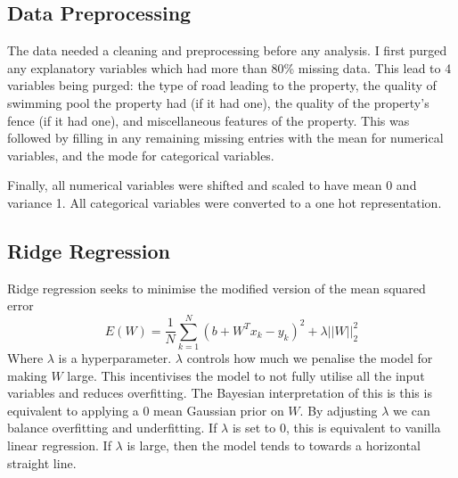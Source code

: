 \documentclass[10pt, twoside]{article}
\begin{document}
\subsection{Data Preprocessing}
The data needed a cleaning and preprocessing before any analysis. I first purged any explanatory variables which had more than 80\% missing data. This lead to 4 variables being purged: the type of road leading to the property, the quality of swimming pool the property had (if it had one), the quality of the property's fence (if it had one), and miscellaneous features of the property. This was followed by filling in any remaining missing entries with the mean for numerical variables, and the mode for categorical variables.

Finally, all numerical variables were shifted and scaled to have mean 0 and variance 1. All categorical variables were converted to a one hot representation.

\subsection{Ridge Regression}
Ridge regression seeks to minimise the modified version of the mean squared error
\[E(W) = \frac{1}{N} \sum_{k=1}^N (b + W^T x_k - y_k)^2 + \lambda ||W||_2^2\]
Where $\lambda$ is a hyperparameter. $\lambda$ controls how much we penalise the model for making $W$ large. This incentivises the model to not fully utilise all the input variables and reduces overfitting. The Bayesian interpretation of this is this is equivalent to applying a 0 mean Gaussian prior on $W$. By adjusting $\lambda$ we can balance overfitting and underfitting. If $\lambda$ is set to 0, this is equivalent to vanilla linear regression. If $\lambda$ is large, then the model tends to towards a horizontal straight line. 
\end{document}
